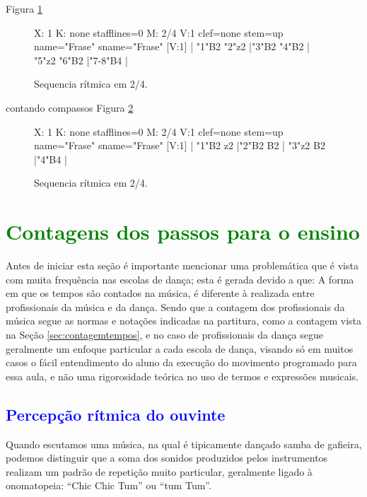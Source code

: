 Figura \ref{fig:contarfrase1} 

\begin{figure}[h]
    \centering
 \begin{abc}[name=abc-contarfrase1]
%
X: 1 %
K: none stafflines=0 %
M:  2/4
V:1 clef=none stem=up name="Frase"   sname="Frase"
%
[V:1] | "1"B2 "2"z2  |"3"B2 "4"B2  | "5"z2 "6"B2  |"7-8"B4  |
%       
\end{abc}
    \caption{Sequencia rítmica em 2/4.}\label{fig:contarfrase1}
\end{figure}

contando compassos Figura \ref{fig:contarfrase2} 

\begin{figure}[h]
    \centering
 \begin{abc}[name=abc-contarfrase2]
%
X: 1 %
K: none stafflines=0 %
M:  2/4
V:1 clef=none stem=up name="Frase"   sname="Frase"
%
[V:1] | "1"B2 z2  |"2"B2 B2  | "3"z2 B2  |"4"B4  |
%       
\end{abc}
    \caption{Sequencia rítmica em 2/4.}\label{fig:contarfrase2}
\end{figure}

\section{\textcolor{green}{Contagens dos passos para o ensino}}
Antes de iniciar esta seção é importante mencionar uma
problemática que é vista com muita frequência nas escolas de dança; 
esta é gerada devido a que: A forma em que os tempos são contados 
na música, é
diferente à realizada entre profissionais da música e da dança. 
Sendo que a contagem dos profissionais da música segue as normas
e notações indicadas na partitura, como a contagem vista na Seção \ref{sec:contagemtempos}, 
e no caso de profissionais da dança segue geralmente um enfoque 
particular a cada escola de dança, visando só em muitos casos o fácil entendimento do aluno da
execução do movimento programado para essa aula, e não uma rigorosidade teórica no uso de termos e 
expressões musicais.


\subsection{\textcolor{blue}{Percepção rítmica do ouvinte}}
\label{subsec:percepcaoouvinte}
Quando escutamos uma música, na qual é tipicamente dançado samba de gafieira,
podemos distinguir que a soma dos sonidos produzidos pelos instrumentos realizam 
um padrão de repetição muito particular, geralmente ligado à onomatopeia: ``Chic Chic Tum'' ou ``tum Tum''.


